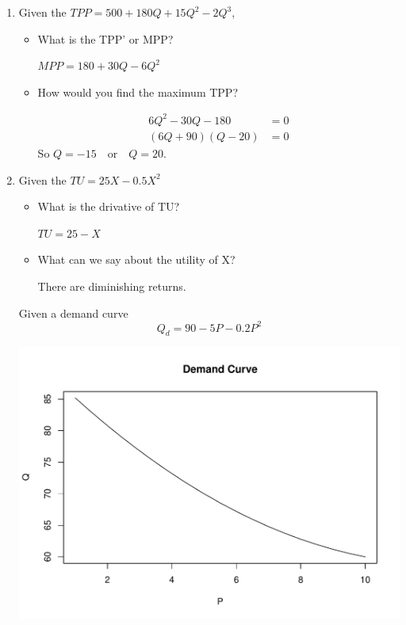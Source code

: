 \documentclass[12pt, a4paper, oneside]{article}\usepackage[]{graphicx}\usepackage[]{color}
\makeatletter
\def\maxwidth{ %
  \ifdim\Gin@nat@width>\linewidth
    \linewidth
  \else
    \Gin@nat@width
  \fi
}
\newenvironment{knitrout}{}{} %
\makeatother
\begin{document}
\begin{enumerate}
\item Given the $TPP = 500 + 180Q + 15Q^2 - 2Q^3$, 
\begin{itemize}
\item What is the TPP' or MPP?

$MPP = 180 + 30Q -6Q^2$

\item How would you find the maximum TPP?

\begin{align*}
6Q^2 - 30Q - 180 &= 0\\
(6Q + 90)(Q - 20) &= 0
\end{align*}
So
$Q = -15 \quad \text{or} \quad Q = 20$. 

\end{itemize}


\item Given the $TU = 25X - 0.5X^2$
\begin{itemize}
\item What is the drivative of TU?

$TU = 25 - X$

\item What can we say about the utility of X?

There are diminishing returns. 

\end{itemize}

Given a demand curve 
\begin{equation*}
Q_d = 90 - 5P - 0.2P^2
\end{equation*}

\begin{knitrout}
\color{fgcolor}
\includegraphics[width=\maxwidth]{figure/plot3-1} 


\end{knitrout}
\end{enumerate}
\end{document}
